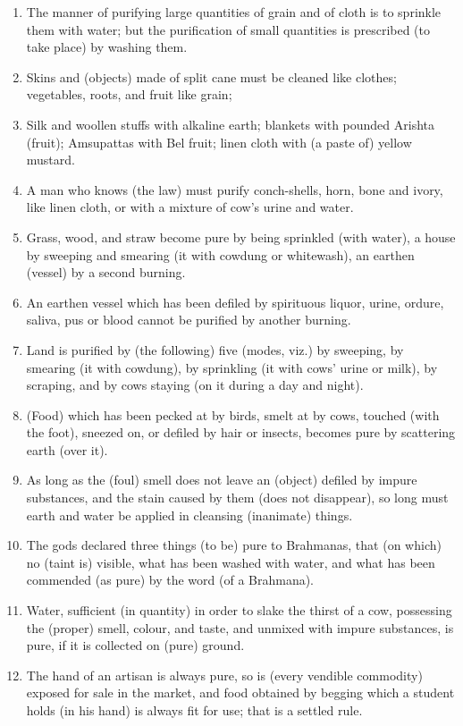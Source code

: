 \begin{enumerate}
\item The manner of purifying large quantities of grain and of cloth is to sprinkle them with water; but the purification of small quantities is prescribed (to take place) by washing them.
\item Skins and (objects) made of split cane must be cleaned like clothes; vegetables, roots, and fruit like grain;
\item Silk and woollen stuffs with alkaline earth; blankets with pounded Arishta (fruit); Amsupattas with Bel fruit; linen cloth with (a paste of) yellow mustard.
\item A man who knows (the law) must purify conch-shells, horn, bone and ivory, like linen cloth, or with a mixture of cow's urine and water.
\item Grass, wood, and straw become pure by being sprinkled (with water), a house by sweeping and smearing (it with cowdung or whitewash), an earthen (vessel) by a second burning.
\item An earthen vessel which has been defiled by spirituous liquor, urine, ordure, saliva, pus or blood cannot be purified by another burning.
\item Land is purified by (the following) five (modes, viz.) by sweeping, by smearing (it with cowdung), by sprinkling (it with cows' urine or milk), by scraping, and by cows staying (on it during a day and night).
\item (Food) which has been pecked at by birds, smelt at by cows, touched (with the foot), sneezed on, or defiled by hair or insects, becomes pure by scattering earth (over it).
\item As long as the (foul) smell does not leave an (object) defiled by impure substances, and the stain caused by them (does not disappear), so long must earth and water be applied in cleansing (inanimate) things.
\item The gods declared three things (to be) pure to Brahmanas, that (on which) no (taint is) visible, what has been washed with water, and what has been commended (as pure) by the word (of a Brahmana).
\item Water, sufficient (in quantity) in order to slake the thirst of a cow, possessing the (proper) smell, colour, and taste, and unmixed with impure substances, is pure, if it is collected on (pure) ground.
\item The hand of an artisan is always pure, so is (every vendible commodity) exposed for sale in the market, and food obtained by begging which a student holds (in his hand) is always fit for use; that is a settled rule.

\end{enumerate}
